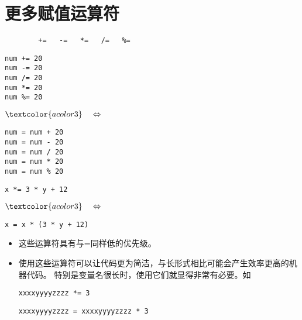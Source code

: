 \section{更多赋值运算符}
\begin{frame}[fragile]\ft{\secname}
\begin{lstlisting}
        +=   -=   *=   /=   %=
\end{lstlisting}
\end{frame}

\begin{frame}[fragile]\ft{\secname}
\begin{minipage}{.4\textwidth}
\begin{lstlisting}
num += 20
num -= 20
num /= 20
num *= 20
num %= 20
\end{lstlisting}
\end{minipage}$\textcolor{acolor3}~~~\Leftrightarrow~~~$
\begin{minipage}{.4\textwidth}
\begin{lstlisting}
num = num + 20
num = num - 20
num = num / 20
num = num * 20
num = num % 20
\end{lstlisting}
\end{minipage}
\pause 
\begin{minipage}{.4\textwidth}
\begin{lstlisting}
x *= 3 * y + 12
\end{lstlisting}
\end{minipage}$\textcolor{acolor3}~~~\Leftrightarrow~~~$
\begin{minipage}{.45\textwidth}
\begin{lstlisting}
x = x * (3 * y + 12)
\end{lstlisting}
\end{minipage}
\end{frame}

\begin{frame}[fragile]\ft{\secname}
\begin{itemize}
\item 
这些运算符具有与=同样低的优先级。\\[0.1in]
\item
使用这些运算符可以让代码更为简洁，与长形式相比可能会产生效率更高的机器代码。
特别是变量名很长时，使用它们就显得非常有必要。如

\begin{lstlisting}
xxxxyyyyzzzz *= 3
\end{lstlisting}
\begin{lstlisting}
xxxxyyyyzzzz = xxxxyyyyzzzz * 3
\end{lstlisting}
\end{itemize}
\end{frame}
